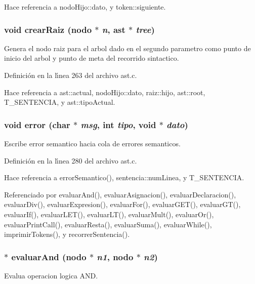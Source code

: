 Hace referencia a nodo\-Hijo::dato, y token::siguiente.
\subsubsection{\setlength{\rightskip}{0pt plus 5cm}void crear\-Raiz ({\bf nodo} $\ast$ {\em n}, {\bf ast} $\ast$ {\em tree})}\label{ast_8c_a18}


Genera el nodo raiz para el arbol dado en el segundo parametro como punto de inicio del arbol y punto de meta del recorrido sintactico. 



Definici\'{o}n en la l\'{\i}nea 263 del archivo ast.c.

Hace referencia a ast::actual, nodo\-Hijo::dato, raiz::hijo, ast::root, T\_\-SENTENCIA, y ast::tipo\-Actual.
\subsubsection{\setlength{\rightskip}{0pt plus 5cm}void error (char $\ast$ {\em msg}, int {\em tipo}, void $\ast$ {\em dato})}\label{ast_8c_a19}


Escribe error semantico hacia cola de errores semanticos. 



Definici\'{o}n en la l\'{\i}nea 280 del archivo ast.c.

Hace referencia a error\-Semantico(), sentencia::num\-Linea, y T\_\-SENTENCIA.

Referenciado por evaluar\-And(), evaluar\-Asignacion(), evaluar\-Declaracion(), evaluar\-Div(), evaluar\-Expresion(), evaluar\-For(), evaluar\-GET(), evaluar\-GT(), evaluar\-If(), evaluar\-LET(), evaluar\-LT(), evaluar\-Mult(), evaluar\-Or(), evaluar\-Print\-Call(), evaluar\-Resta(), evaluar\-Suma(), evaluar\-While(), imprimir\-Tokens(), y recorrer\-Sentencia().
\subsubsection{$\ast$ evaluar\-And ({\bf nodo} $\ast$ {\em n1}, {\bf nodo} $\ast$ {\em n2})}\label{ast_8c_a27}


Evalua operacion logica AND. 



